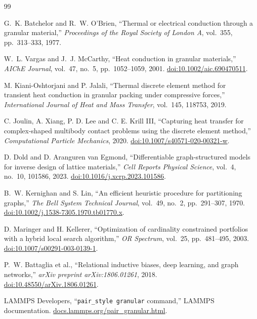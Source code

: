 \documentclass[12pt,a4paper]{article}
\begin{document}
	\begin{thebibliography}{99}
		
		G.~K. Batchelor and R.~W. O'Brien,
		``Thermal or electrical conduction through a granular material,''
		\emph{Proceedings of the Royal Society of London A}, vol.~355,
		pp.~313--333, 1977.
		
		W.~L. Vargas and J.~J. McCarthy,
		``Heat conduction in granular materials,''
		\emph{AIChE Journal}, vol.~47, no.~5, pp.~1052--1059, 2001.
		\href{https://doi.org/10.1002/aic.690470511}{doi:10.1002/aic.690470511}.
		
		M. Kiani-Oshtorjani and P. Jalali,
		``Thermal discrete element method for transient heat conduction in granular
		packing under compressive forces,''
		\emph{International Journal of Heat and Mass Transfer}, vol.~145,
		118753, 2019.
		
		C. Joulin, A. Xiang, P. D. Lee and C. E. Krill III,
		``Capturing heat transfer for complex-shaped multibody contact problems using
		the discrete element method,''
		\emph{Computational Particle Mechanics}, 2020.
		\href{https://doi.org/10.1007/s40571-020-00321-w}
		{doi:10.1007/s40571-020-00321-w}.
		
		D. Dold and D. Aranguren van Egmond,
		``Differentiable graph-structured models for inverse design of lattice
		materials,''
		\emph{Cell Reports Physical Science}, vol.~4, no.~10, 101586, 2023.
		\href{https://doi.org/10.1016/j.xcrp.2023.101586}
		{doi:10.1016/j.xcrp.2023.101586}.
		
		B.~W. Kernighan and S. Lin,
		``An efficient heuristic procedure for partitioning graphs,''
		\emph{The Bell System Technical Journal}, vol.~49, no.~2,
		pp.~291--307, 1970.
		\href{https://doi.org/10.1002/j.1538-7305.1970.tb01770.x}
		{doi:10.1002/j.1538-7305.1970.tb01770.x}.
		
		D. Maringer and H. Kellerer,
		``Optimization of cardinality constrained portfolios with a hybrid local
		search algorithm,''
		\emph{OR Spectrum}, vol.~25, pp.~481--495, 2003.
		\href{https://doi.org/10.1007/s00291-003-0139-1}
		{doi:10.1007/s00291-003-0139-1}.
		
		P.~W. Battaglia et al.,
		``Relational inductive biases, deep learning, and graph networks,''
		\emph{arXiv preprint arXiv:1806.01261}, 2018.
		\href{https://doi.org/10.48550/arXiv.1806.01261}
		{doi:10.48550/arXiv.1806.01261}.
		
		LAMMPS Developers,
		``\texttt{pair\_style granular} command,'' LAMMPS documentation.
		\href{https://docs.lammps.org/pair_granular.html}
		{docs.lammps.org/pair\_granular.html}.
		
	\end{thebibliography}
	
\end{document}
